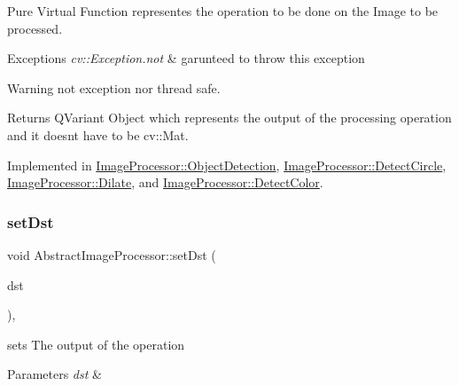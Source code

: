 Pure Virtual Function representes the operation to be done on the Image to be processed. 


\begin{DoxyExceptions}{Exceptions}
{\em cv\+::\+Exception.\+not} & garunteed to throw this exception \\
\hline
\end{DoxyExceptions}
\begin{DoxyWarning}{Warning}
not exception nor thread safe. 
\end{DoxyWarning}
\begin{DoxyReturn}{Returns}
Q\+Variant Object which represents the output of the processing operation and it doesn\textquotesingle{}t have to be cv\+::\+Mat. 
\end{DoxyReturn}


Implemented in \hyperlink{class_image_processor_1_1_object_detection_ac5561650d95eac1672e2d049ed36201d}{Image\+Processor\+::\+Object\+Detection}, \hyperlink{class_image_processor_1_1_detect_circle_ae0c7b4759827b218a03b16567233b4d5}{Image\+Processor\+::\+Detect\+Circle}, \hyperlink{class_image_processor_1_1_dilate_ac4af4d83e97990416f1ccc6b80fd140b}{Image\+Processor\+::\+Dilate}, and \hyperlink{class_image_processor_1_1_detect_color_afb14622f8e1390f1cf887cc8bf1da568}{Image\+Processor\+::\+Detect\+Color}.

\mbox{\label{class_image_processor_1_1_abstract_image_processor_a8d9dcbea1b426f4accdd8fcc650eb6ab}} 
\subsubsection{\texorpdfstring{set\+Dst}{setDst}}
{\footnotesize\ttfamily void Abstract\+Image\+Processor\+::set\+Dst (\begin{DoxyParamCaption}\item[{const cv\+::\+Mat \&}]{dst }\end{DoxyParamCaption})\hspace{0.3cm}{\ttfamily [virtual]}, {\ttfamily [slot]}}



sets The output of the operation 


\begin{DoxyParams}{Parameters}
{\em dst} & \\
\hline
\end{DoxyParams}


